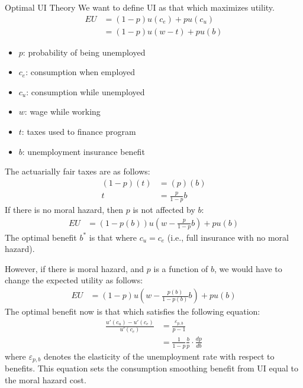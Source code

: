 \documentclass[10pt]{extarticle}
\begin{document}
  \begin{problem}{Optimal UI Theory}
    We want to define UI as that which maximizes utility.
    \begin{align*}
      EU &= (1-p)u(c_e) + pu(c_u)\\
         &= (1-p)u(w-t) + pu(b)
    \end{align*}
    \begin{itemize}
      \item $p$: probability of being unemployed
      \item $c_e$: consumption when employed
      \item $c_u$: consumption while unemployed
      \item $w$: wage while working
      \item $t$: taxes used to finance program
      \item $b$: unemployment insurance benefit
    \end{itemize}
    The actuarially fair taxes are as follows:
    \begin{align*}
      (1-p)(t) &= (p)(b)\\
      t &= \frac{p}{1-p}b
    \end{align*}
    If there is no moral hazard, then $p$ is not affected by $b$:
    \begin{align*}
      EU &= (1-p(b))u\left(w-\frac{p}{1-p}b\right) + pu(b)
    \end{align*}
    The optimal benefit $b^*$ is that where $c_u = c_e$ (i.e., full insurance with no moral hazard).\newline

    However, if there is moral hazard, and $p$ is a function of $b$, we would have to change the expected utility as follows:
    \begin{align*}
      EU &= (1-p)u\left(w - \frac{p(b)}{1-p(b)}b\right) + pu(b)
    \end{align*}
    The optimal benefit now is that which satisfies the following equation:
    \begin{align*}
      \frac{u'(c_u) - u'(c_e)}{u'(c_e)} &= \frac{\varepsilon_{p,b}}{p-1}\\
       &= \frac{1}{1-p}\frac{b}{p}\cdot\frac{dp}{db}
    \end{align*}
    where $\varepsilon_{p,b}$ denotes the elasticity of the unemployment rate with respect to benefits. This equation sets the consumption smoothing benefit from UI equal to the moral hazard cost.\newline


\end{problem}
\end{document}
